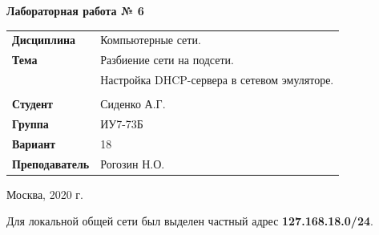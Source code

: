 \documentclass[a4paper,14pt]{extreport} %
\begin{document}
\begin{titlepage}
    \vspace{2cm}

    \begin{center}
        \textbf{Лабораторная работа № 6} \\
        \vspace{0.5cm}
    \end{center}

    \vspace{4cm}

    \begin{flushleft}
        \begin{tabular}{ll}
            \textbf{Дисциплина} & Компьютерные сети.  \\
            \textbf{Тема} & Разбиение сети на подсети. \\
            & Настройка DHCP-сервера в сетевом эмуляторе.  \\
            \\
            \textbf{Студент} & Сиденко А.Г. \\
            \textbf{Группа} & ИУ7-73Б \\
            \textbf{Вариант} & 18\\
            \textbf{Преподаватель} & Рогозин Н.О.  \\
        \end{tabular}
    \end{flushleft}

    \vspace{4cm}

   \begin{center}
        Москва, 2020 г.
    \end{center}

\end{titlepage}

Для локальной общей сети был выделен частный адрес \textbf{127.168.18.0/24}. 
\end{document}
